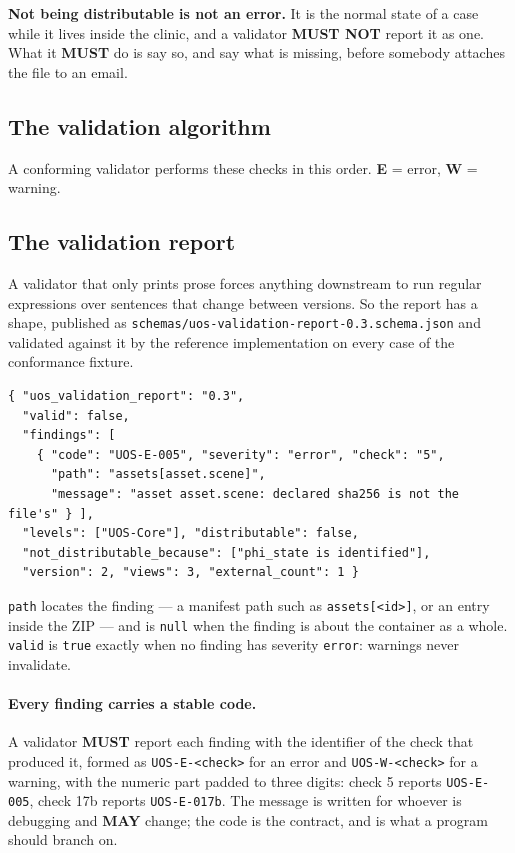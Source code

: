 \documentclass[11pt,a4paper]{article}
\newcommand{\MUST}{\textcolor{uosred}{\textbf{MUST}}}
\newcommand{\MUSTNOT}{\textcolor{uosred}{\textbf{MUST NOT}}}
\newcommand{\MAY}{\textcolor{uosgreen}{\textbf{MAY}}}
\newcommand{\code}[1]{\texttt{\small #1}}
\begin{document}
\textbf{Not being distributable is not an error.} It is the normal state of a case while it
lives inside the clinic, and a validator \MUSTNOT{} report it as one. What it \MUST{} do is
say so, and say what is missing, before somebody attaches the file to an email.

\subsection{The validation algorithm}\label{sec:algo}

A conforming validator performs these checks in this order. \textbf{E} = error,
\textbf{W} = warning.

\subsection{The validation report}\label{sec:report}

A validator that only prints prose forces anything downstream to run regular expressions
over sentences that change between versions. So the report has a shape, published as
\code{schemas/uos-validation-report-0.3.schema.json} and validated against it by the
reference implementation on every case of the conformance fixture.

\begin{lstlisting}[style=js]
{ "uos_validation_report": "0.3",
  "valid": false,
  "findings": [
    { "code": "UOS-E-005", "severity": "error", "check": "5",
      "path": "assets[asset.scene]",
      "message": "asset asset.scene: declared sha256 is not the file's" } ],
  "levels": ["UOS-Core"], "distributable": false,
  "not_distributable_because": ["phi_state is identified"],
  "version": 2, "views": 3, "external_count": 1 }
\end{lstlisting}

\code{path} locates the finding --- a manifest path such as \code{assets[<id>]}, or an
entry inside the ZIP --- and is \code{null} when the finding is about the container as a
whole. \code{valid} is \code{true} exactly when no finding has severity \code{error}:
warnings never invalidate.

\paragraph{Every finding carries a stable code.} A validator \MUST{} report each
finding with the identifier of the check that produced it, formed as
\code{UOS-E-<check>} for an error and \code{UOS-W-<check>} for a warning, with the numeric
part padded to three digits: check 5 reports \code{UOS-E-005}, check 17b reports
\code{UOS-E-017b}. The message is written for whoever is debugging and \MAY{} change; the
code is the contract, and is what a program should branch on.
\end{document}
